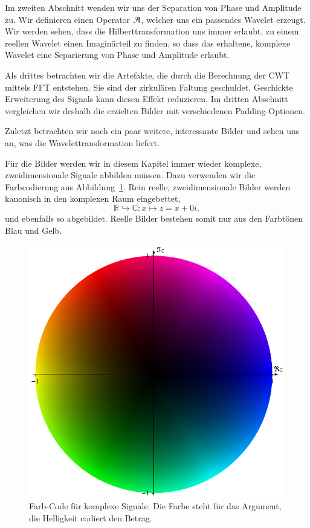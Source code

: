 \begin{refsection}
Im zweiten Abschnitt wenden wir uns der Separation von Phase und Amplitude zu.
Wir definieren einen Operator $\Ana\,$, welcher uns ein passendes Wavelet erzeugt.
Wir werden sehen, dass die Hilberttransformation uns immer erlaubt, zu einem reellen Wavelet einen Imaginärteil zu finden,
so dass das erhaltene, komplexe Wavelet eine Separierung von Phase und Amplitude erlaubt.

Als drittes betrachten wir die Artefakte, die durch die Berechnung der CWT mittels FFT entstehen.
Sie sind der zirkulären Faltung geschuldet.
Geschickte Erweiterung des Signals kann diesen Effekt reduzieren.
Im dritten Abschnitt vergleichen wir deshalb die erzielten Bilder mit verschiedenen Padding-Optionen.

Zuletzt betrachten wir noch ein paar weitere, interessante Bilder und sehen uns an, was die Wavelettransformation liefert.

Für die Bilder werden wir in diesem Kapitel immer wieder komplexe, zweidimensionale Signale abbilden müssen.
Dazu verwenden wir die Farbcodierung aus Abbildung~\ref{complex:color-code}.
Rein reelle, zweidimensionale Bilder werden kanonisch in den komplexen Raum eingebettet, 
\[ \mathbb R \hookrightarrow \mathbb C \colon x \mapsto z = x + 0i,\]
und ebenfalls so abgebildet.
Reelle Bilder bestehen somit nur aus den Farbtönen Blau und Gelb.

\begin{figure}
	\centering
	\includegraphics[width=.5\linewidth]{papers/complex/images/colors.pdf}
	\caption{Farb-Code für komplexe Signale. Die Farbe steht für das Argument, die Helligkeit codiert den Betrag.}
	\label{complex:color-code}
\end{figure}












\printbibliography[heading=subbibliography]
\end{refsection}
